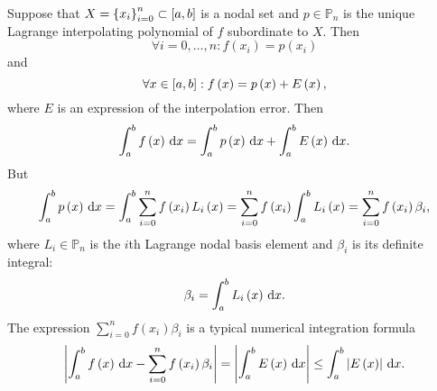 \begin{frame}
	Suppose that
	\begin{math}
		X={\left\{x_{i}\right\}}_{i=0}^{n}\subset
		\left[a,b\right]
	\end{math}
	is a nodal set and $p\in\mathbb{P}_{n}$ is the unique Lagrange
	interpolating polynomial of $f$ subordinate to $X$.
	Then
	\begin{equation*}
		\forall i=0,\dotsc,n:
		f\left(x_{i}\right)=
		p\left(x_{i}\right)
	\end{equation*}
	and
	\begin{equation*}
		\forall x\in
		\left[a,b\right]:
		f\left(x\right)=
		p\left(x\right)+
		E\left(x\right),
	\end{equation*}
	where $E$ is an expression of the interpolation error.
	Then
	\begin{equation*}
		\int_{a}^{b}
		f\left(x\right)
		\dl x=
		\int_{a}^{b}
		p\left(x\right)
		\dl x+
		\int_{a}^{b}
		E\left(x\right)
		\dl x.
	\end{equation*}
	But
	\begin{equation*}
		\int_{a}^{b}
		p\left(x\right)
		\dl x=
		\int_{a}^{b}
		\sum_{i=0}^{n}
		f\left(x_{i}\right)
		L_{i}\left(x\right)=
		\sum_{i=0}^{n}
		f\left(x_{i}\right)
		\int_{a}^{b}
		L_{i}\left(x\right)=
		\sum_{i=0}^{n}
		f\left(x_{i}\right)
		\beta_{i},
	\end{equation*}
	where $L_{i}\in\mathbb{P}_{n}$ is the $i$th Lagrange nodal basis
	element and $\beta_{i}$ is its definite integral:
	\begin{equation*}
		\beta_{i}=
		\int_{a}^{b}
		L_{i}\left(x\right)
		\dl x.
	\end{equation*}
	The expression
	\begin{math}
		\sum_{i=0}^{n}
		f\left(x_{i}\right)
		\beta_{i}
	\end{math}
	is a typical numerical integration formula
	\begin{equation*}
		\left|
		\int_{a}^{b}
		f\left(x\right)
		\dl x-
		\sum_{i=0}^{n}
		f\left(x_{i}\right)
		\beta_{i}
		\right|=
		\left|
		\int_{a}^{b}
		E\left(x\right)
		\dl x
		\right|\leq
		\int_{a}^{b}
		\left|
		E\left(x\right)
		\right|
		\dl x.
	\end{equation*}
\end{frame}

